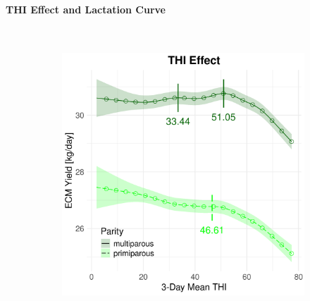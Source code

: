 \paragraph{THI Effect and Lactation Curve} \quad \\
\begin{figure}[H]
    \centering
    \begin{subfigure}[b]{0.45\textwidth}
        \centering
        \includegraphics[width=\textwidth]{thesis/figures/models/ecm/full/je_ecm_full/je_ecm_full_marginal_thi_milk_combined.png}
    \end{subfigure}
    \hspace{0.05\textwidth} %
    \begin{subfigure}[b]{0.45\textwidth}
        \centering

\end{subfigure}
\end{figure}
